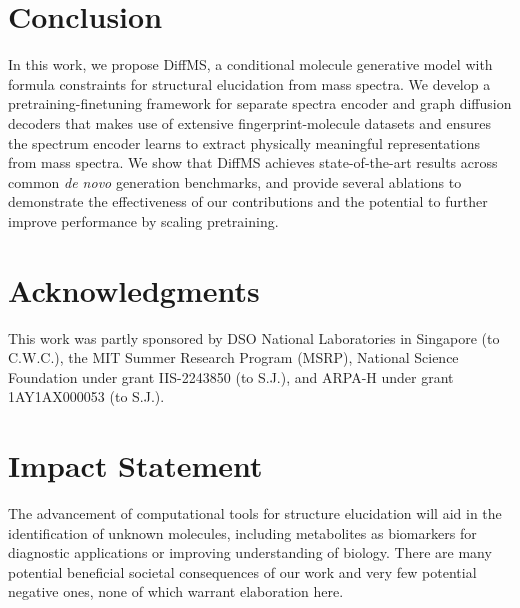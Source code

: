 \documentclass{article}
\theoremstyle{plain}
\theoremstyle{definition}
\theoremstyle{remark}
\newcommand{\ours}{DiffMS\xspace}
\begin{document}
\section{Conclusion}

In this work, we propose \ours, a conditional molecule generative model with formula constraints for structural elucidation from mass spectra. We develop a pretraining-finetuning framework for separate spectra encoder and graph diffusion decoders that makes use of extensive fingerprint-molecule datasets and ensures the spectrum encoder learns to extract physically meaningful representations from mass spectra. We show that \ours achieves state-of-the-art results across common \textit{de novo} generation benchmarks, and provide several ablations to demonstrate the effectiveness of our contributions and the potential to further improve performance by scaling pretraining.   




\section*{Acknowledgments}
This work was partly sponsored by DSO National Laboratories in Singapore (to C.W.C.), the MIT Summer Research Program (MSRP), National Science Foundation under grant IIS-2243850 (to S.J.), and ARPA-H under grant 1AY1AX000053 (to S.J.).

\section*{Impact Statement}
The advancement of computational tools for structure elucidation will aid in the identification of unknown molecules, including metabolites as biomarkers for diagnostic applications or improving understanding of biology. There are many potential beneficial societal consequences of our work and very few potential negative ones, none of which warrant elaboration here.
\end{document}
